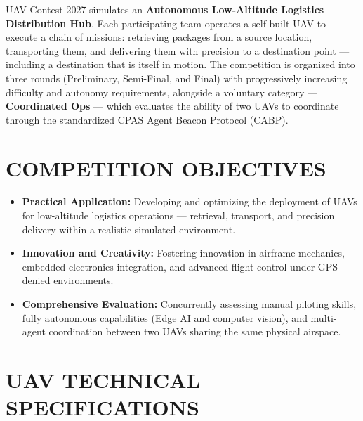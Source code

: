 \documentclass[12pt,a4paper]{article}
\begin{document}
UAV Contest 2027 simulates an \textbf{Autonomous Low-Altitude Logistics Distribution Hub}. Each participating team operates a self-built UAV to execute a chain of missions: retrieving packages from a source location, transporting them, and delivering them with precision to a destination point — including a destination that is itself in motion. The competition is organized into three rounds (Preliminary, Semi-Final, and Final) with progressively increasing difficulty and autonomy requirements, alongside a voluntary category — \textbf{Coordinated Ops} — which evaluates the ability of two UAVs to coordinate through the standardized CPAS Agent Beacon Protocol (CABP).

\section{COMPETITION OBJECTIVES}

\begin{itemize}
\item \textbf{Practical Application:} Developing and optimizing the deployment of UAVs for low-altitude logistics operations — retrieval, transport, and precision delivery within a realistic simulated environment.
\item \textbf{Innovation and Creativity:} Fostering innovation in airframe mechanics, embedded electronics integration, and advanced flight control under GPS-denied environments.
\item \textbf{Comprehensive Evaluation:} Concurrently assessing manual piloting skills, fully autonomous capabilities (Edge AI and computer vision), and multi-agent coordination between two UAVs sharing the same physical airspace.
\end{itemize}

\section{UAV TECHNICAL SPECIFICATIONS}
\end{document}
